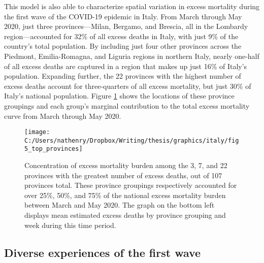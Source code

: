 \documentclass[
]{article}
\begin{document}
This model is also able to characterize spatial variation in excess mortality during the first wave of the COVID-19 epidemic in Italy. From March through May 2020, just three provinces---Milan, Bergamo, and Brescia, all in the Lombardy region---accounted for 32\% of all excess deaths in Italy, with just 9\% of the country's total population. By including just four other provinces across the Piedmont, Emilia-Romagna, and Liguria regions in northern Italy, nearly one-half of all excess deaths are captured in a region that makes up just 16\% of Italy's population. Expanding further, the 22 provinces with the highest number of excess deaths account for three-quarters of all excess mortality, but just 30\% of Italy's national population. Figure \ref{fig:top-provinces} shows the locations of these province groupings and each group's marginal contribution to the total excess mortality curve from March through May 2020.

\begin{figure}[!p]

{\centering \texttt{[image: C:/Users/nathenry/Dropbox/Writing/thesis/graphics/italy/fig5\_top\_provinces]} 

}

\caption{Concentration of excess mortality burden among the 3, 7, and 22 provinces with the greatest number of excess deaths, out of 107 provinces total. These province groupings respectively accounted for over 25\%, 50\%, and 75\% of the national excess mortality burden between March and May 2020. The graph on the bottom left displays mean estimated excess deaths by province grouping and week during this time period.}\label{fig:top-provinces}
\end{figure}

\hypertarget{diverse-experiences-of-the-first-wave}{%
\subsection{Diverse experiences of the first wave}\label{diverse-experiences-of-the-first-wave}}
\end{document}

